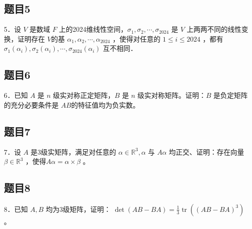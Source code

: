 \documentclass{article}
\begin{document}
\subsection{题目5}
5．设 \(V\) 是数域 \(F\) 上的2024维线性空间，\(\sigma_{1}, \sigma_{2}, \cdots, \sigma_{2024}\) 是 \(V\) 上两两不同的线性变换，证明存在 \(V\)的基 \(\alpha_{1}, \alpha_{2}, \cdots, \alpha_{2024}\) ，使得对任意的 \(1 \leq i \leq 2024\) ，都有 \(\sigma_{1}\left(\alpha_{i}\right), \sigma_{2}\left(\alpha_{i}\right), \cdots, \sigma_{2024}\left(\alpha_{i}\right)\) 互不相同．

\subsection{题目6}
6．已知 \(A\) 是 \(n\) 级实对称正定矩阵，\(B\) 是 \(n\) 级实对称矩阵。证明：\(B\) 是负定矩阵的充分必要条件是 \(A B\)的特征值均为负实数。

\subsection{题目7}
7．设 \(A\) 是3级实矩阵，满足对任意的 \(\alpha \in \mathbb{R}^{3}, \alpha\) 与 \(A \alpha\) 均正交、证明：存在向量 \(\beta \in \mathbb{R}^{3}\) ，使得\(A \alpha=\alpha \times \beta\) 。

\subsection{题目8}
8．已知 \(A, B\) 均为3级矩阵，证明： \(\operatorname{det}(A B-B A)=\frac{1}{3} \operatorname{tr}\left((A B-B A)^{3}\right)\) 。
\end{document}
